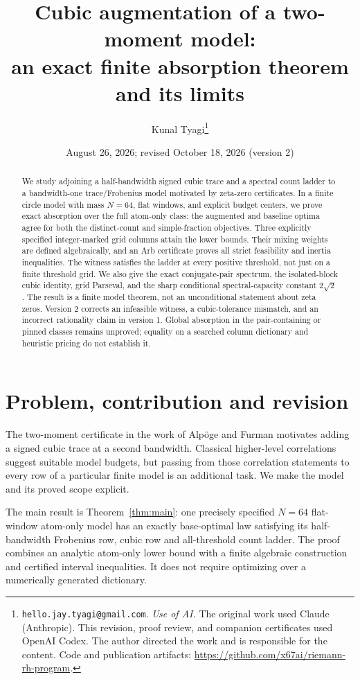 \documentclass[11pt]{article}
\title{Cubic augmentation of a two-moment model:\\
an exact finite absorption theorem and its limits}
\author{Kunal Tyagi\thanks{\texttt{hello.jay.tyagi@gmail.com}.
\emph{Use of AI.} The original work used Claude (Anthropic). This revision,
proof review, and companion certificates used OpenAI Codex. The author directed
the work and is responsible for the content. Code and publication artifacts:
\url{https://github.com/x67ai/riemann-rh-program}.}}
\date{August 26, 2026; revised October 18, 2026 (version 2)}
\theoremstyle{definition}\newtheorem{definition}[theorem]{Definition}
\theoremstyle{remark}\newtheorem{remark}[theorem]{Remark}
\begin{document}
\maketitle
\begin{abstract}
We study adjoining a half-bandwidth signed cubic trace and a spectral count
ladder to a bandwidth-one trace/Frobenius model motivated by zeta-zero
certificates. In a finite circle model with mass $N=64$, flat windows, and
explicit budget centers, we prove exact absorption over the full atom-only
class: the augmented and baseline optima agree for both the distinct-count
and simple-fraction objectives. Three explicitly specified integer-marked
grid columns attain the lower bounds. Their mixing weights are defined
algebraically, and an Arb certificate proves all strict feasibility and
inertia inequalities. The witness satisfies the ladder at every positive
threshold, not just on a finite threshold grid. We also give the exact
conjugate-pair spectrum, the isolated-block cubic identity, grid Parseval,
and the sharp conditional spectral-capacity constant $2\sqrt2$.
The result is a finite model theorem, not an unconditional statement about
zeta zeros. Version 2 corrects an infeasible witness, a cubic-tolerance
mismatch, and an incorrect rationality claim in version 1. Global absorption
in the pair-containing or pinned classes remains unproved; equality on a
searched column dictionary and heuristic pricing do not establish it.
\end{abstract}

\section{Problem, contribution and revision}
The two-moment certificate in the work of Alp\"oge and Furman \cite{AF26}
motivates adding a signed cubic trace at a second bandwidth. Classical
higher-level correlations \cite{RS96} suggest suitable model budgets, but
passing from those correlation statements to every row of a particular
finite model is an additional task. We make the model and its proved scope
explicit.

The main result is Theorem~\ref{thm:main}: one precisely specified $N=64$
flat-window atom-only model has an exactly base-optimal law satisfying its
half-bandwidth Frobenius row, cubic row and all-threshold count ladder.
The proof combines an analytic atom-only lower bound with a finite
algebraic construction and certified interval inequalities. It does not
require optimizing over a numerically generated dictionary.
\end{document}
